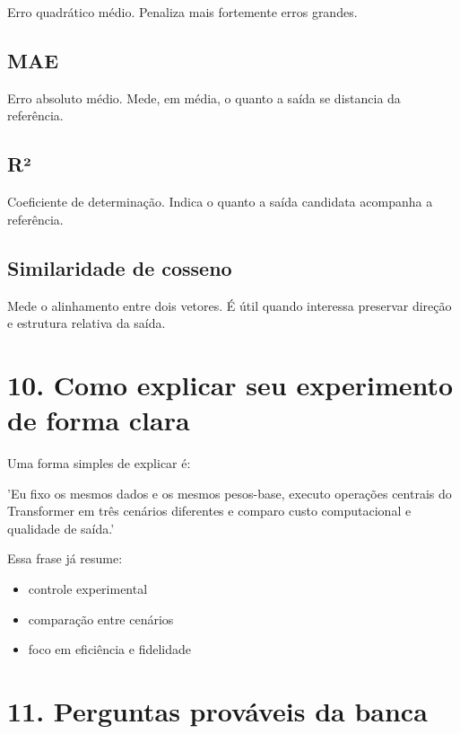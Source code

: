 Erro quadrático médio. Penaliza mais fortemente erros grandes.



\subsection{MAE}


Erro absoluto médio. Mede, em média, o quanto a saída se distancia da referência.



\subsection{R²}


Coeficiente de determinação. Indica o quanto a saída candidata acompanha a referência.



\subsection{Similaridade de cosseno}



Mede o alinhamento entre dois vetores. É útil quando interessa preservar direção e estrutura relativa da saída.



\section{10. Como explicar seu experimento de forma clara}



Uma forma simples de explicar é:



'Eu fixo os mesmos dados e os mesmos pesos-base, executo operações centrais do Transformer em três cenários diferentes e comparo custo computacional e qualidade de saída.'



Essa frase já resume:

\begin{itemize}
\item controle experimental
\item comparação entre cenários
\item foco em eficiência e fidelidade
\end{itemize}


\section{11. Perguntas prováveis da banca}



